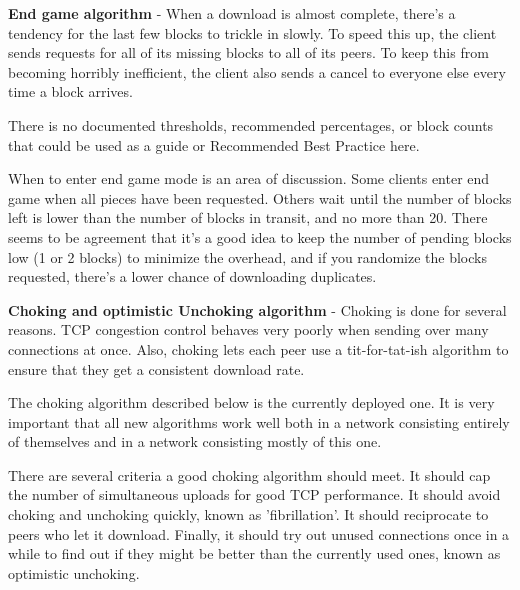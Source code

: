 \documentclass[11pt]{article}
\begin{document}
  \begin{flushleft}

    \textbf{End game algorithm} - When a download is almost complete, there's a tendency for the last few blocks to trickle in slowly. To speed this up, the client sends requests for all of its missing blocks to all of its peers. To keep this from becoming horribly inefficient, the client also sends a cancel to everyone else every time a block arrives.

  \end{flushleft}
  \begin{flushleft}

    There is no documented thresholds, recommended percentages, or block counts that could be used as a guide or Recommended Best Practice here.

  \end{flushleft}
  \begin{flushleft}

    When to enter end game mode is an area of discussion. Some clients enter end game when all pieces have been requested. Others wait until the number of blocks left is lower than the number of blocks in transit, and no more than 20. There seems to be agreement that it's a good idea to keep the number of pending blocks low (1 or 2 blocks) to minimize the overhead, and if you randomize the blocks requested, there's a lower chance of downloading duplicates.

  \end{flushleft}
  \begin{flushleft}

    \textbf{Choking and optimistic Unchoking algorithm} - Choking is done for several reasons. TCP congestion control behaves very poorly when sending over many connections at once. Also, choking lets each peer use a tit-for-tat-ish algorithm to ensure that they get a consistent download rate.

  \end{flushleft}
  \begin{flushleft}

    The choking algorithm described below is the currently deployed one. It is very important that all new algorithms work well both in a network consisting entirely of themselves and in a network consisting mostly of this one.

  \end{flushleft}
  \begin{flushleft}

    There are several criteria a good choking algorithm should meet. It should cap the number of simultaneous uploads for good TCP performance. It should avoid choking and unchoking quickly, known as 'fibrillation'. It should reciprocate to peers who let it download. Finally, it should try out unused connections once in a while to find out if they might be better than the currently used ones, known as optimistic unchoking.

  \end{flushleft}
\end{document}

